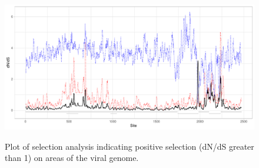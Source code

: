 \documentclass[fleqn,10pt,lineno]{wlpeerj}
\begin{document}
\begin{figure}[ht]
\centering
\caption{
Plot of selection analysis indicating positive selection (dN/dS greater than 1) on areas of the viral genome.
}
\includegraphics[width=1.0\textwidth]{figures/selectionplot.pdf}
\label{fig:tissuetype}
\end{figure}
\clearpage
\end{document}
